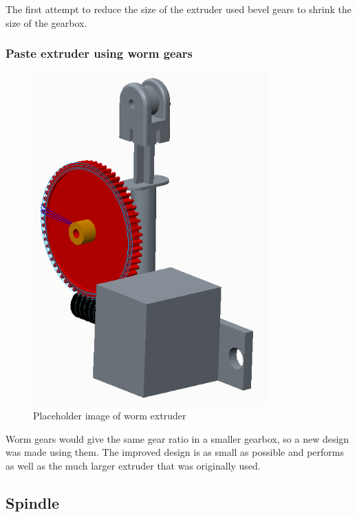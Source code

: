 The first attempt to reduce the size of the extruder used bevel gears to shrink the size of the gearbox. 

\subsubsection{Paste extruder using worm gears}
\begin{figure}[ht!]
\centering
\includegraphics[width=90mm]{resources/extruder_worm.png}
\caption{Placeholder image of worm extruder}
\label{overflow}
\end{figure}

Worm gears would give the same gear ratio in a smaller gearbox, so a new design was made using them. The improved design is as small as possible and performs as well as the much larger extruder that
was originally used.

\subsection{Spindle}

